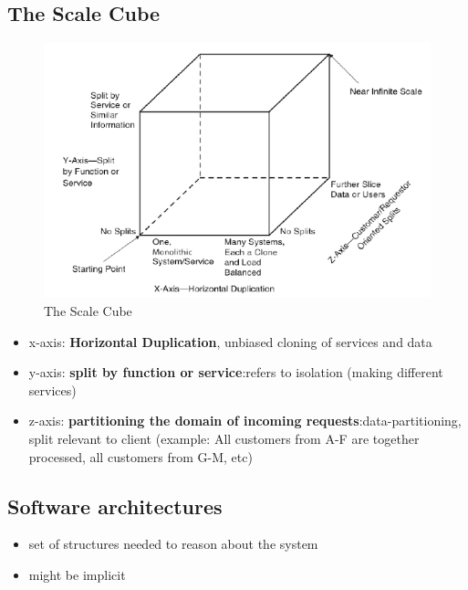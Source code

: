 \documentclass[a4paper]{article}
\begin{document}
\begin{multicols}{3}
\subsection{The Scale Cube}
\begin{figure}[H]
    \includegraphics[width=\linewidth]{ScaleCube.png}
    \caption{The Scale Cube}
    \label{fig:scalecube}
\end{figure}

\begin{itemize}
    \item x-axis: \textbf{Horizontal Duplication}, unbiased cloning of services and data
    \item y-axis: \textbf{split by function or service}:refers to isolation (making different services)
    \item z-axis: \textbf{partitioning the domain of incoming requests}:data-partitioning, split relevant to 
    client (example: All customers from A-F are together processed, all customers from G-M, etc)
\end{itemize}

\subsection{Software architectures}
\begin{itemize}
    \item set of structures needed to reason about the system
    \item might be implicit
\end{itemize}


\end{multicols}
\end{document}
